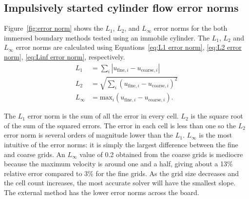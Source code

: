 \documentclass[preprint,12pt,5p]{elsarticle}
\begin{document}
\subsection{Impulsively started cylinder flow error norms}
Figure~\ref{fig:error norm} shows the $L_1$, $L_2$, and $L_\infty$ error norms for the both immersed boundary methods tested using an immobile cylinder.
The $L_1$, $L_2$ and $L_\infty$ error norms are calculated using Equations~\eqref{eq:L1 error norm}, \eqref{eq:L2 error norm}, \eqref{eq:Linf error norm}, respectively.
\begin{align}
L_1 &= \sum_{i} \left|u_{\text{fine}, i}-u_{\text{coarse},i}\right| \label{eq:L1 error norm} \\
L_2 &= \sqrt{\sum_{i} \left(u_{\text{fine}, i}-u_{\text{coarse},i}\right)^2} \label{eq:L2 error norm} \\
L_{\infty} &= \text{max}_i\left(u_{\text{fine}, i}-u_{\text{coarse},i}\right) .\ \label{eq:Linf error norm}
\end{align}

The $L_1$ error norm is the sum of all the error in every cell. 
$L_2$ is the square root of the sum of the squared errors. 
The error in each cell is less than one so the $L_2$ error norm is several orders of magnitude lower than the $L_1$. 
$L_\infty$ is the most intuitive of the error norms: it is simply the largest difference between the fine and coarse grids. 
An $L_\infty$ value of 0.2 obtained from the coarse grids is mediocre because the maximum velocity is around one and a half, giving about a 13\% relative error compared to 3\% for the fine grids. 
As the grid size decreases and the cell count increases, the most accurate solver will have the smallest slope. 
The external method has the lower error norms across the board. 
\end{document}
